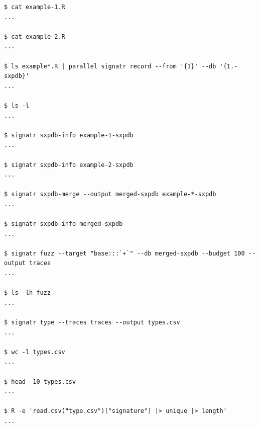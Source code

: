\documentclass[sigplan,anonymous,review]{acmart}
\begin{document}

\begin{lstlisting}
$ cat example-1.R
...

$ cat example-2.R
...

$ ls example*.R | parallel signatr record --from '{1}' --db '{1.-sxpdb}'
...

$ ls -l
...

$ signatr sxpdb-info example-1-sxpdb
...

$ signatr sxpdb-info example-2-sxpdb
...

$ signatr sxpdb-merge --output merged-sxpdb example-*-sxpdb
...

$ signatr sxpdb-info merged-sxpdb
...

$ signatr fuzz --target "base:::`+`" --db merged-sxpdb --budget 100 --output traces
...

$ ls -lh fuzz
...

$ signatr type --traces traces --output types.csv
...

$ wc -l types.csv
...

$ head -10 types.csv
...

$ R -e 'read.csv("type.csv")["signature"] |> unique |> length'
...

\end{lstlisting}
\end{document}
